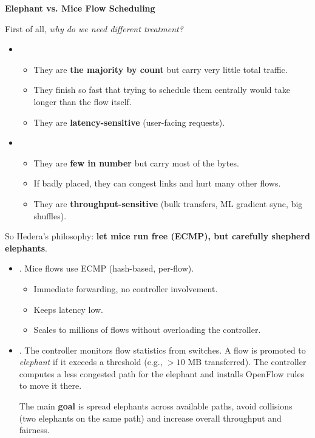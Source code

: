 \newpage

\begin{flushleft}
    \textcolor{Green3}{ \textbf{Elephant vs. Mice Flow Scheduling}}
\end{flushleft}
First of all, \emph{why do we need different treatment?}
\begin{itemize}
    \item {}
    \begin{itemize}
        \item They are \textbf{the majority by count} but carry very little total traffic.
        \item They finish so fast that trying to schedule them centrally would take longer than the flow itself.
        \item They are \textbf{latency-sensitive} (user-facing requests).
    \end{itemize}
    \item {}
    \begin{itemize}
        \item They are \textbf{few in number} but carry most of the bytes.
        \item If badly placed, they can congest links and hurt many other flows.
        \item They are \textbf{throughput-sensitive} (bulk transfers, ML gradient sync, big shuffles).
    \end{itemize}
\end{itemize}
So Hedera's philosophy: \textbf{let mice run free (ECMP), but carefully shepherd elephants}.
\begin{itemize}
    \item {}. Mice flows use ECMP (hash-based, per-flow).
    \begin{itemize}
        \item[\textcolor{Green3}{\faIcon{check}}] Immediate forwarding, no controller involvement.
        \item[\textcolor{Green3}{\faIcon{check}}] Keeps latency low.
        \item[\textcolor{Green3}{\faIcon{check}}] Scales to millions of flows without overloading the controller.
    \end{itemize}
    \item {}. The controller monitors flow statistics from switches. A flow is promoted to \emph{elephant} if it exceeds a threshold (e.g., $>10$ MB transferred). The controller computes a less congested path for the elephant and installs OpenFlow rules to move it there.

    The main \textbf{goal} is spread elephants across available paths, avoid collisions (two elephants on the same path) and increase overall throughput and fairness.
\end{itemize}


